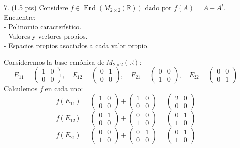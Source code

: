 7. (1.5 pts) Considere \( f \in \operatorname{End}\left(M_{2 \times 2}(\mathbb{R})\right) \) dado por \( f(A)=A+A^{t} \). Encuentre:\\
- Polinomio característico.\\
- Valores y vectores propios.\\
- Espacios propios asociados a cada valor propio.\\

\begin{solution}
Consideremos la base canónica de \( M_{2 \times 2}(\mathbb{R}) \):
\[
   E_{11} = \begin{pmatrix} 1 & 0 \\ 0 & 0 \end{pmatrix}, \quad E_{12} = \begin{pmatrix} 0 & 1 \\ 0 & 0 \end{pmatrix}, \quad E_{21} = \begin{pmatrix} 0 & 0 \\ 1 & 0 \end{pmatrix}, \quad E_{22} = \begin{pmatrix} 0 & 0 \\ 0 & 1 \end{pmatrix}
   \]
   Calculemos \( f \) en cada uno:
   \[
   f(E_{11}) = \begin{pmatrix} 1 & 0 \\ 0 & 0 \end{pmatrix} + \begin{pmatrix} 1 & 0 \\ 0 & 0 \end{pmatrix} = \begin{pmatrix} 2 & 0 \\ 0 & 0 \end{pmatrix}
   \]
\[
   f(E_{12}) = \begin{pmatrix} 0 & 1 \\ 0 & 0 \end{pmatrix} + \begin{pmatrix} 0 & 0 \\ 1 & 0 \end{pmatrix} = \begin{pmatrix} 0 & 1 \\ 1 & 0 \end{pmatrix}
   \]
\[
   f(E_{21}) = \begin{pmatrix} 0 & 0 \\ 1 & 0 \end{pmatrix} + \begin{pmatrix} 0 & 1 \\ 0 & 0 \end{pmatrix} = \begin{pmatrix} 0 & 1 \\ 1 & 0 \end{pmatrix}
\]
\end{solution}
